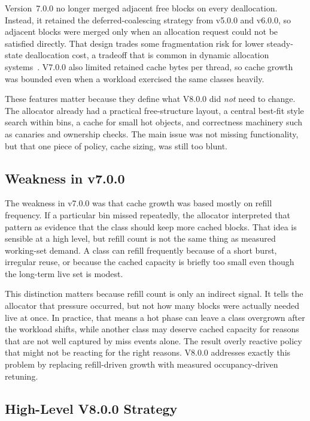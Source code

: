 Version~7.0.0 no longer merged adjacent free blocks on every deallocation. Instead, it retained
the deferred-coalescing strategy from v5.0.0 and v6.0.0, so adjacent blocks were merged only when an allocation
request could not be satisfied directly. That design trades some fragmentation risk for lower steady-state
deallocation cost, a tradeoff that is common in dynamic allocation systems~\cite{wilson1995}. V7.0.0 also
limited retained cache bytes per thread, so cache growth was bounded even when a workload exercised the same
classes heavily.

These features matter because they define what V8.0.0 did \textit{not} need to change. The allocator already
had a practical free-structure layout, a central best-fit style search within bins, a cache for small hot
objects, and correctness machinery such as canaries and ownership checks. The main issue was not missing
functionality, but that one piece of policy, cache sizing, was still too blunt.

\subsection{Weakness in v7.0.0}

The weakness in v7.0.0 was that cache growth was based mostly on refill frequency. If a particular bin missed
repeatedly, the allocator interpreted that pattern as evidence that the class should keep more cached blocks.
That idea is sensible at a high level, but refill count is not the same thing as measured working-set demand.
A class can refill frequently because of a short burst, irregular reuse, or because the cached
capacity is briefly too small even though the long-term live set is modest.

This distinction matters because refill count is only an indirect signal. It tells the allocator that pressure
occurred, but not how many blocks were actually needed live at once. In practice, that means a hot phase can
leave a class overgrown after the workload shifts, while another class may deserve cached capacity for reasons
that are not well captured by miss events alone. The result overly reactive policy that might not be reacting
for the right reasons. V8.0.0 addresses exactly this problem by replacing refill-driven growth with measured
occupancy-driven retuning.

\subsection{High-Level V8.0.0 Strategy}


